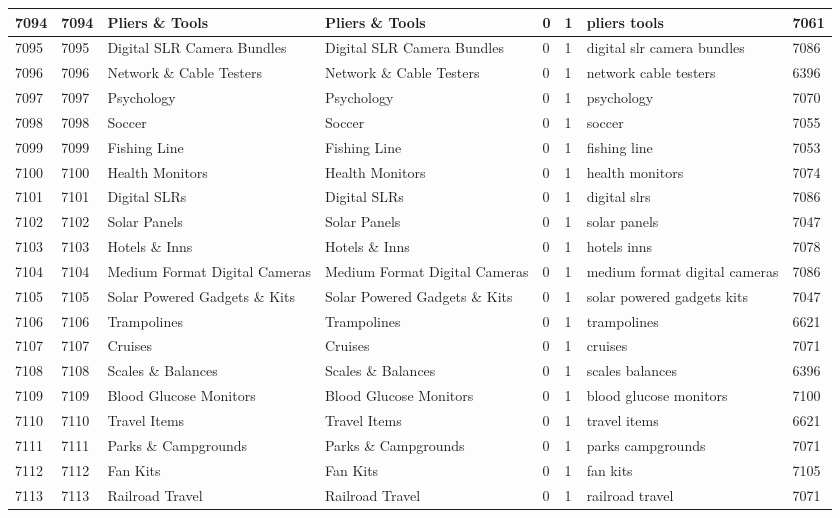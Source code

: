\begin{longtable}{|l|l|l|l|l|l|l|l|}
7094 & 7094 & Pliers \& Tools & Pliers \& Tools & 0 & 1 & pliers tools & 7061 \\ \hline 
7095 & 7095 & Digital SLR Camera Bundles & Digital SLR Camera Bundles & 0 & 1 & digital slr camera bundles & 7086 \\ \hline 
7096 & 7096 & Network \& Cable Testers & Network \& Cable Testers & 0 & 1 & network cable testers & 6396 \\ \hline 
7097 & 7097 & Psychology & Psychology & 0 & 1 & psychology & 7070 \\ \hline 
7098 & 7098 & Soccer & Soccer & 0 & 1 & soccer & 7055 \\ \hline 
7099 & 7099 & Fishing Line & Fishing Line & 0 & 1 & fishing line & 7053 \\ \hline 
7100 & 7100 & Health Monitors & Health Monitors & 0 & 1 & health monitors & 7074 \\ \hline 
7101 & 7101 & Digital SLRs & Digital SLRs & 0 & 1 & digital slrs & 7086 \\ \hline 
7102 & 7102 & Solar Panels & Solar Panels & 0 & 1 & solar panels & 7047 \\ \hline 
7103 & 7103 & Hotels \& Inns & Hotels \& Inns & 0 & 1 & hotels inns & 7078 \\ \hline 
7104 & 7104 & Medium Format Digital Cameras & Medium Format Digital Cameras & 0 & 1 & medium format digital cameras & 7086 \\ \hline 
7105 & 7105 & Solar Powered Gadgets \& Kits & Solar Powered Gadgets \& Kits & 0 & 1 & solar powered gadgets kits & 7047 \\ \hline 
7106 & 7106 & Trampolines & Trampolines & 0 & 1 & trampolines & 6621 \\ \hline 
7107 & 7107 & Cruises & Cruises & 0 & 1 & cruises & 7071 \\ \hline 
7108 & 7108 & Scales \& Balances & Scales \& Balances & 0 & 1 & scales balances & 6396 \\ \hline 
7109 & 7109 & Blood Glucose Monitors & Blood Glucose Monitors & 0 & 1 & blood glucose monitors & 7100 \\ \hline 
7110 & 7110 & Travel Items & Travel Items & 0 & 1 & travel items & 6621 \\ \hline 
7111 & 7111 & Parks \& Campgrounds & Parks \& Campgrounds & 0 & 1 & parks campgrounds & 7071 \\ \hline 
7112 & 7112 & Fan Kits & Fan Kits & 0 & 1 & fan kits & 7105 \\ \hline 
7113 & 7113 & Railroad Travel & Railroad Travel & 0 & 1 & railroad travel & 7071 \\ \hline 

\end{longtable}
